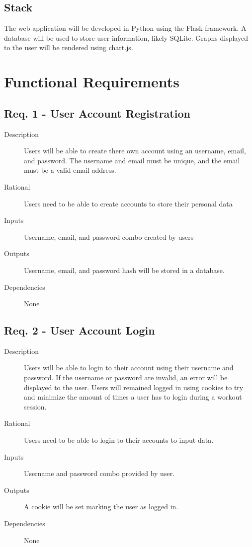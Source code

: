 \documentclass[12pt]{article}
\begin{document}
\subsection{Stack}
The web application will be developed in Python using the Flask framework. A database will be used to store user information, likely SQLite. Graphs displayed to the user will be rendered using chart.js.


\section{Functional Requirements}

\subsection{Req. 1 - User Account Registration}
\begin{description}
	\item[Description] Users will be able to create there own account using an username, email, and password. The username and email must be unique, and the email must be a valid email address.
	\item[Rational] Users need to be able to create accounts to store their personal data
	\item[Inputs] Username, email, and password combo created by users
	\item[Outputs] Username, email, and password hash will be stored in a database.
	\item[Dependencies] None
\end{description}

\subsection{Req. 2 - User Account Login}
\begin{description}
	\item[Description] Users will be able to login to their account using their username and password. If the username or password are invalid, an error will be displayed to the user. Users will remained logged in using cookies to try and minimize the amount of times a user has to login during a workout session.
	\item[Rational] Users need to be able to login to their accounts to input data.
	\item[Inputs] Username and password combo provided by user.
	\item[Outputs] A cookie will be set marking the user as logged in.
	\item[Dependencies] None
\end{description}
\end{document}
